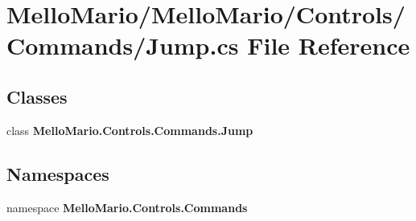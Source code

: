 \section{Mello\+Mario/\+Mello\+Mario/\+Controls/\+Commands/\+Jump.cs File Reference}
\label{Jump_8cs}
\subsection*{Classes}
\begin{DoxyCompactItemize}
\item 
class \textbf{ Mello\+Mario.\+Controls.\+Commands.\+Jump}
\end{DoxyCompactItemize}
\subsection*{Namespaces}
\begin{DoxyCompactItemize}
\item 
namespace \textbf{ Mello\+Mario.\+Controls.\+Commands}
\end{DoxyCompactItemize}
